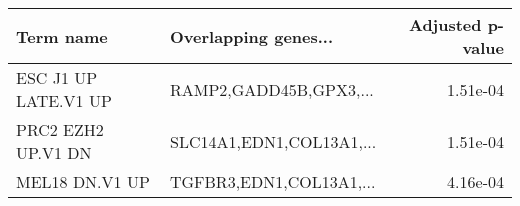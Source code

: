\begin{tabular}{llr}
\toprule
           Term name &     Overlapping genes... &  Adjusted p-value \\
\midrule
ESC J1 UP LATE.V1 UP &   RAMP2,GADD45B,GPX3,... &          1.51e-04 \\
  PRC2 EZH2 UP.V1 DN & SLC14A1,EDN1,COL13A1,... &          1.51e-04 \\
      MEL18 DN.V1 UP &  TGFBR3,EDN1,COL13A1,... &          4.16e-04 \\
\bottomrule
\end{tabular}
